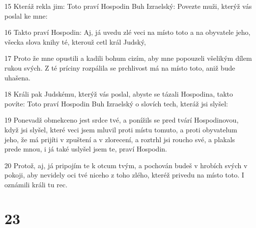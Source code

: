 \par 15 Kteráž rekla jim: Toto praví Hospodin Buh Izraelský: Povezte muži, kterýž vás poslal ke mne:
\par 16 Takto praví Hospodin: Aj, já uvedu zlé veci na místo toto a na obyvatele jeho, všecka slova knihy té, kterouž cetl král Judský,
\par 17 Proto že mne opustili a kadili bohum cizím, aby mne popouzeli všelikým dílem rukou svých. Z té príciny rozpálila se prchlivost má na místo toto, aniž bude uhašena.
\par 18 Králi pak Judskému, kterýž vás poslal, abyste se tázali Hospodina, takto povíte: Toto praví Hospodin Buh Izraelský o slovích tech, kteráž jsi slyšel:
\par 19 Ponevadž obmekceno jest srdce tvé, a ponížils se pred tvárí Hospodinovou, když jsi slyšel, které veci jsem mluvil proti místu tomuto, a proti obyvatelum jeho, že má prijíti v zpuštení a v zlorecení, a roztrhl jsi roucho své, a plakals prede mnou, i já také uslyšel jsem te, praví Hospodin.
\par 20 Protož, aj, já pripojím te k otcum tvým, a pochován budeš v hrobích svých v pokoji, aby nevidely oci tvé niceho z toho zlého, kteréž privedu na místo toto. I oznámili králi tu rec.

\chapter{23}

